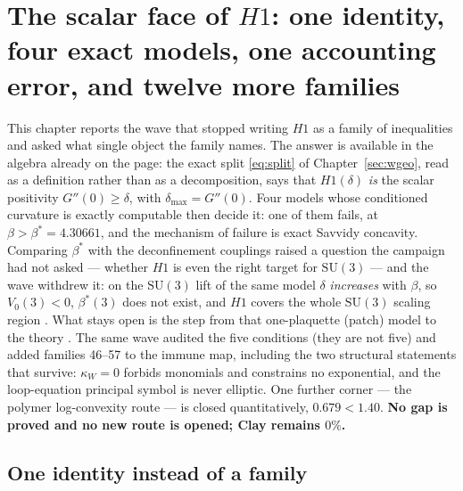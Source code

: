 \section{The scalar face of $H1$: one identity, four exact models, one accounting
error, and twelve more families}
\label{ch:scalar-h1}

This chapter reports the wave that stopped writing $H1$ as a family of inequalities and asked
what single object the family names. The answer is available in the algebra already on the page:
the exact split \eqref{eq:split} of Chapter~\ref{sec:wgeo}, read as a definition rather than as a
decomposition, says that $H1(\delta)$ \emph{is} the scalar positivity $G''(0)\ge\delta$, with
$\delta_{\max}=G''(0)$. Four models whose conditioned curvature is exactly computable then decide
it: one of them fails, at $\beta>\beta^*=4.30661$, and the mechanism of failure is exact Savvidy
concavity. Comparing $\beta^*$ with the deconfinement couplings raised a question the campaign had
not asked --- whether $H1$ is even the right target for $\mathrm{SU}(3)$ --- and the wave withdrew
it: on the $\mathrm{SU}(3)$ lift of the same model $\delta$ \emph{increases} with $\beta$, so
$V_0(3)<0$, $\beta^*(3)$ does not exist, and $H1$ covers the whole $\mathrm{SU}(3)$ scaling region
\LE{}. What stays open is the step from that one-plaquette (patch) model to the theory \LM{}.
The same wave audited the five conditions (they are not five) and added families 46--57 to the
immune map, including the two structural statements that survive: $\kappa_W=0$ forbids monomials
and constrains no exponential, and the loop-equation principal symbol is never elliptic. One
further corner --- the polymer log-convexity route --- is closed quantitatively, $0.679<1.40$.
\textbf{No gap is proved and no new route is opened; Clay remains $0\%$.}

\subsection{One identity instead of a family}
\label{sec:scalar-identity}

